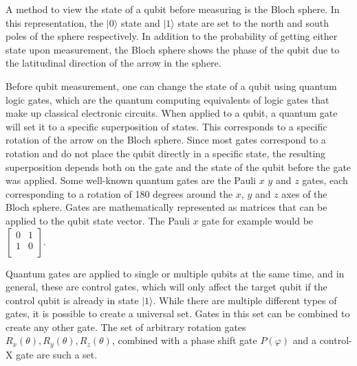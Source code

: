 A method to view the state of a qubit before measuring is the Bloch sphere. 
In this representation, the  $|0 \rangle$ state and $|1 \rangle$ state are set to the north and south poles of the sphere respectively\cite{wisemanInterpretationQuantumJump1993}. In addition to the 
probability of getting either state upon measurement, the Bloch sphere shows the phase of the qubit due to the latitudinal direction of the arrow in the sphere\cite{mckayEfficientGatesQuantum2017}.

Before qubit measurement, one can change the state of a qubit using quantum logic gates, which are the quantum computing equivalents of logic 
gates that make up classical electronic circuits. When applied to a qubit, a quantum gate will set it to a specific superposition of states. This corresponds to a 
specific rotation of the arrow on the Bloch sphere\cite{mummaneniLaserControlledImplementationControlledNOT2022}. Since most gates correspond to a rotation and do not place the qubit directly in a specific state, the resulting superposition
depends both on the gate and the state of the qubit before the gate was applied. Some well-known quantum gates are the Pauli $x$ $y$ and $z$ gates, each corresponding to a 
rotation of 180 degrees around the $x$, $y$ and $z$ axes of the Bloch sphere. Gates are mathematically represented as matrices that can be applied to the qubit state vector.
The Pauli $x$ gate for example would be $\begin{bmatrix}
    0 & 1\\
    1 & 0\\
\end{bmatrix}$.

\newpage
Quantum gates are applied to single or multiple qubits at the same time, and in general, these are control gates, which will only affect the target qubit if the control qubit
is already in state $|1 \rangle$. While there are multiple different types of gates, it is possible to create a universal set. Gates in this set can be
combined to create any other gate. The set of arbitrary rotation gates $R_x(\theta), R_y(\theta), R_z(\theta)$, combined with a phase shift gate $P(\varphi)$ and a control-X 
gate are such a set\cite{williamsQuantumGates2011}.


